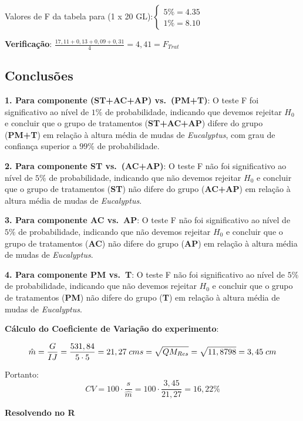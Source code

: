\documentclass[
]{book}
\begin{document}
Valores de F da tabela para (1 x 20 GL):\(\begin{cases} 5\%=4.35 \\ 1\%=8.10 \end{cases}\)

\textbf{Verificação}: \(\frac{17,11+0,13+0,09+0,31}{4}=4,41=F_{Trat}\)

\hypertarget{conclusuxf5es}{%
\subsection{\texorpdfstring{\textbf{Conclusões}}{Conclusões}}\label{conclusuxf5es}}

\textbf{1. Para componente (ST+AC+AP) vs.~(PM+T)}: O teste F foi significativo ao nível de \(1\%\) de probabilidade, indicando que devemos rejeitar \(H_0\) e concluir que o grupo de tratamentos (\textbf{ST+AC+AP}) difere do grupo (\textbf{PM+T}) em relação à altura média de mudas de \emph{Eucalyptus}, com grau de confiança superior a \(99\%\) de probabilidade.

\textbf{2. Para componente ST vs.~(AC+AP)}: O teste F não foi significativo ao nível de \(5\%\) de probabilidade, indicando que não devemos rejeitar \(H_0\) e concluir que o grupo de tratamentos (\textbf{ST}) não difere do grupo (\textbf{AC+AP}) em relação à altura média de mudas de \emph{Eucalyptus}.

\textbf{3. Para componente AC vs.~AP}: O teste F não foi significativo ao nível de \(5\%\) de probabilidade, indicando que não devemos rejeitar \(H_0\) e concluir que o grupo de tratamentos (\textbf{AC}) não difere do grupo (\textbf{AP}) em relação à altura média de mudas de \emph{Eucalyptus}.

\textbf{4. Para componente PM vs.~T}: O teste F não foi significativo ao nível de \(5\%\) de probabilidade, indicando que não devemos rejeitar \(H_0\) e concluir que o grupo de tratamentos (\textbf{PM}) não difere do grupo (\textbf{T}) em relação à altura média de mudas de \emph{Eucalyptus}.

\textbf{Cálculo do Coeficiente de Variação do experimento}:

\[
\hat{m} = \frac{G}{IJ} = \frac{531,84}{5\cdot5} = 21,27\;cm \\
s = \sqrt{QM_{Res}}=\sqrt{11,8798}=3,45\;cm\\
\]

Portanto:
\[
CV=100\cdot \frac{s}{\hat{m}} = 100\cdot \frac{3,45}{21,27}=16,22\%
\]

\textbf{Resolvendo no R}
\end{document}
